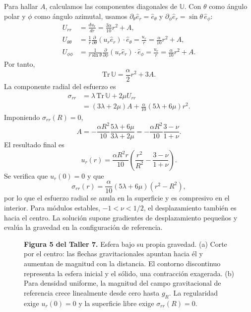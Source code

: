 Para hallar $A$, calculamos las componentes diagonales de $\mathbb U$. Con $\theta$ como ángulo polar y $\phi$ como ángulo azimutal, usamos $\partial_\theta\hat e_r=\hat e_\theta$ y $\partial_\phi\hat e_r=\sin\theta\,\hat e_\phi$:
\[
\begin{aligned}
U_{rr}
&=\frac{du_r}{dr}=\frac{3\alpha}{10}r^2+A,\\
U_{\theta\theta}
&=\frac{1}{r}\frac{\partial}{\partial\theta}(u_r\hat e_r)\cdot\hat e_\theta
=\frac{u_r}{r}=\frac{\alpha}{10}r^2+A,\\
U_{\phi\phi}
&=\frac{1}{r\sin\theta}\frac{\partial}{\partial\phi}(u_r\hat e_r)\cdot\hat e_\phi
=\frac{u_r}{r}=\frac{\alpha}{10}r^2+A.
\end{aligned}
\]
Por tanto,
\[
\mathrm{Tr}\,\mathbb U=\frac{\alpha}{2}r^2+3A.
\]
La componente radial del esfuerzo es
\[
\begin{aligned}
\sigma_{rr}
&=\lambda\,\mathrm{Tr}\,\mathbb U+2\mu U_{rr}\\
&=(3\lambda+2\mu)A+\frac{\alpha}{10}(5\lambda+6\mu)r^2.
\end{aligned}
\]
Imponiendo $\sigma_{rr}(R)=0$,
\[
A=-\frac{\alpha R^2}{10}\frac{5\lambda+6\mu}{3\lambda+2\mu}
=-\frac{\alpha R^2}{10}\frac{3-\nu}{1+\nu}.
\]
El resultado final es
\[
\boxed{u_r(r)=\frac{\alpha R^2r}{10}
\left(\frac{r^2}{R^2}-\frac{3-\nu}{1+\nu}\right)}.
\]
Se verifica que $u_r(0)=0$ y que
\[
\sigma_{rr}(r)=\frac{\alpha}{10}(5\lambda+6\mu)(r^2-R^2),
\]
por lo que el esfuerzo radial se anula en la superficie y es compresivo en el interior. Para módulos estables, $-1<\nu<1/2$, el desplazamiento también es hacia el centro. La solución supone gradientes de desplazamiento pequeños y evalúa la gravedad en la configuración de referencia.

\begin{figure}[H]
\centering

\par\medskip
\begin{minipage}{\textwidth}
\textbf{Figura 5 del Taller 7.} Esfera bajo su propia gravedad. (a) Corte por el centro: las flechas gravitacionales apuntan hacia él y aumentan de magnitud con la distancia. El contorno discontinuo representa la esfera inicial y el sólido, una contracción exagerada. (b) Para densidad uniforme, la magnitud del campo gravitacional de referencia crece linealmente desde cero hasta $g_R$. La regularidad exige $u_r(0)=0$ y la superficie libre exige $\sigma_{rr}(R)=0$.
\end{minipage}
\end{figure}